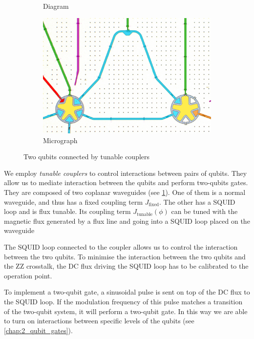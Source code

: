 \begin{figure}
    \centering
    \begin{subfigure}{0.65\textwidth}
        \centering
        
        \vspace{-1cm}
        \caption{Diagram}
        \label{fig:tun_coupl}
    \end{subfigure}
    \hspace{0.3cm}
    \begin{subfigure}{0.25\textwidth}
        \centering
        \includegraphics[width=\textwidth]{Images/Chap1/tun_couplers.png} 
        \caption{Micrograph}
        \label{fig:tun_coupl_real}
    \end{subfigure}
    \caption{Two qubits connected by tunable couplers}
    \label{fig:tun_coupl_tot}
\end{figure}

We employ \emph{tunable couplers} \cite{tun_coupler} to control interactions between pairs of qubits.
They allow us to mediate interaction between the qubits and perform two-qubits gates.
They are composed of two coplanar waveguides (see \cref{fig:tun_coupl}).
One of them is a normal waveguide, and thus has a fixed coupling term $J_\text{fixed}$.
The other has a SQUID loop and is flux tunable.
Its coupling term $J_\text{tunable}(\phi)$ can be tuned with the magnetic flux generated by a flux line and going into a SQUID loop placed on the waveguide

The SQUID loop connected to the coupler allows us to control the interaction between the two qubits. 
To minimise the interaction between the two qubits and the ZZ crosstalk, the DC flux driving the SQUID loop has to be calibrated to the operation point.

To implement a two-qubit gate, a sinusoidal pulse is sent on top of the DC flux to the SQUID loop. If the modulation frequency of this pulse matches a transition of the two-qubit system, it will perform a two-qubit gate.
In this way we are able to turn on interactions between specific levels of the qubits (see \cref{chap:2_qubit_gates}).